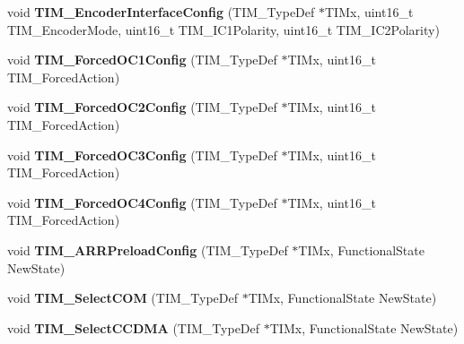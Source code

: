 \begin{DoxyCompactItemize}
\item 
\hypertarget{group__TIM__Exported__Functions_ga0fc7e76c47a3bd1ba1ebc71427832b51}{
void {\bfseries TIM\_\-EncoderInterfaceConfig} (TIM\_\-TypeDef $\ast$TIMx, uint16\_\-t TIM\_\-EncoderMode, uint16\_\-t TIM\_\-IC1Polarity, uint16\_\-t TIM\_\-IC2Polarity)}
\label{group__TIM__Exported__Functions_ga0fc7e76c47a3bd1ba1ebc71427832b51}

\item 
\hypertarget{group__TIM__Exported__Functions_ga4f58c12e6493a0d8b9555c9097b831d6}{
void {\bfseries TIM\_\-ForcedOC1Config} (TIM\_\-TypeDef $\ast$TIMx, uint16\_\-t TIM\_\-ForcedAction)}
\label{group__TIM__Exported__Functions_ga4f58c12e6493a0d8b9555c9097b831d6}

\item 
\hypertarget{group__TIM__Exported__Functions_ga3d2902b6fbab8dd55cd531055ffcc63d}{
void {\bfseries TIM\_\-ForcedOC2Config} (TIM\_\-TypeDef $\ast$TIMx, uint16\_\-t TIM\_\-ForcedAction)}
\label{group__TIM__Exported__Functions_ga3d2902b6fbab8dd55cd531055ffcc63d}

\item 
\hypertarget{group__TIM__Exported__Functions_ga920b0fb4ca44fceffd1c3e441feebd8f}{
void {\bfseries TIM\_\-ForcedOC3Config} (TIM\_\-TypeDef $\ast$TIMx, uint16\_\-t TIM\_\-ForcedAction)}
\label{group__TIM__Exported__Functions_ga920b0fb4ca44fceffd1c3e441feebd8f}

\item 
\hypertarget{group__TIM__Exported__Functions_gaf0a0bbe74251e56d4b835d20b0a3aa63}{
void {\bfseries TIM\_\-ForcedOC4Config} (TIM\_\-TypeDef $\ast$TIMx, uint16\_\-t TIM\_\-ForcedAction)}
\label{group__TIM__Exported__Functions_gaf0a0bbe74251e56d4b835d20b0a3aa63}

\item 
\hypertarget{group__TIM__Exported__Functions_ga42b44b9fc2b0798d733720dd6bac1ac0}{
void {\bfseries TIM\_\-ARRPreloadConfig} (TIM\_\-TypeDef $\ast$TIMx, FunctionalState NewState)}
\label{group__TIM__Exported__Functions_ga42b44b9fc2b0798d733720dd6bac1ac0}

\item 
\hypertarget{group__TIM__Exported__Functions_gaff2e7f9959b1b36e830df028c14accc8}{
void {\bfseries TIM\_\-SelectCOM} (TIM\_\-TypeDef $\ast$TIMx, FunctionalState NewState)}
\label{group__TIM__Exported__Functions_gaff2e7f9959b1b36e830df028c14accc8}

\item 
\hypertarget{group__TIM__Exported__Functions_ga5273cb65acb885fe7982827b1c6b7d75}{
void {\bfseries TIM\_\-SelectCCDMA} (TIM\_\-TypeDef $\ast$TIMx, FunctionalState NewState)}
\label{group__TIM__Exported__Functions_ga5273cb65acb885fe7982827b1c6b7d75}


\end{DoxyCompactItemize}
